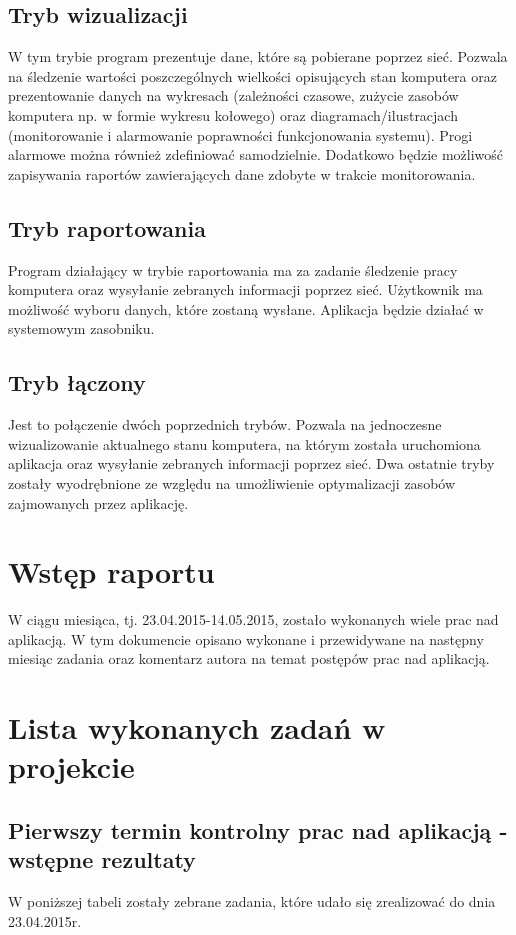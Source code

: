 \documentclass[a4paper]{article}
\begin{document}
	\subsection{Tryb wizualizacji}
		W tym trybie program prezentuje dane, które są pobierane poprzez sieć. Pozwala na śledzenie wartości poszczególnych wielkości opisujących stan komputera oraz prezentowanie danych na wykresach (zależności czasowe, zużycie zasobów komputera np. w formie wykresu kołowego) oraz diagramach/ilustracjach (monitorowanie i alarmowanie poprawności funkcjonowania systemu). Progi alarmowe można również zdefiniować samodzielnie. Dodatkowo będzie możliwość zapisywania raportów zawierających dane zdobyte w trakcie monitorowania.
	
	\subsection{Tryb raportowania}
		Program działający w trybie raportowania ma za zadanie śledzenie pracy komputera oraz wysyłanie zebranych informacji poprzez sieć. Użytkownik ma możliwość wyboru danych, które zostaną wysłane. Aplikacja będzie działać w systemowym zasobniku.
	
	\subsection{Tryb łączony}
		Jest to połączenie dwóch poprzednich trybów. Pozwala na jednoczesne wizualizowanie aktualnego stanu komputera, na którym została uruchomiona aplikacja oraz wysyłanie zebranych informacji poprzez sieć. Dwa ostatnie tryby zostały wyodrębnione ze względu na umożliwienie optymalizacji zasobów zajmowanych przez aplikację.
	


\section{Wstęp raportu}

W ciągu miesiąca, tj. 23.04.2015-14.05.2015, zostało wykonanych wiele prac nad aplikacją. W tym dokumencie opisano wykonane i przewidywane na następny miesiąc zadania oraz komentarz autora na temat postępów prac nad aplikacją.

\section{Lista wykonanych zadań w projekcie}

\subsection{Pierwszy termin kontrolny prac nad aplikacją - wstępne rezultaty}
W poniższej tabeli zostały zebrane zadania, które udało się zrealizować do dnia 23.04.2015r.
\end{document}
